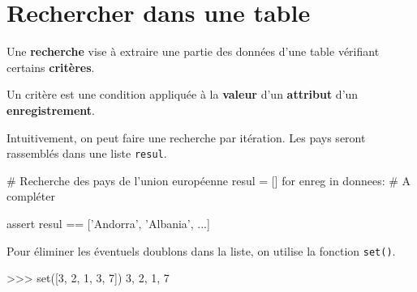 \pagebreak

\section{Rechercher dans une table}

\begin{definition}{}
Une \textbf{recherche} vise à extraire une partie des données d'une table vérifiant certains \textbf{critères}.

Un critère est une condition appliquée à la \textbf{valeur} d'un \textbf{attribut} d'un \textbf{enregistrement}.

\end{definition}


\begin{exercice_cours}{}

	Intuitivement, on peut faire une recherche par itération. Les pays seront rassemblés dans une liste \verb+resul+.

\begin{CodePythontexAlt}[TaillePolice=\normalsize, Largeur=1\linewidth,Centre,PremLigne=1, Lignes=false,]{}
# Recherche des pays de l'union européenne
resul = []
for enreg in donnees:
	# A compléter
	
	



assert resul == ['Andorra', 'Albania', ...]
\end{CodePythontexAlt}

\end{exercice_cours}

\begin{exercice_cours}{}


	\end{exercice_cours}


	\begin{remarque}{}
		Pour éliminer les éventuels doublons dans la liste, on utilise la fonction \verb+set()+.
	
	
\begin{CodePythontexAlt}[TaillePolice=\normalsize, Largeur=1\linewidth,Centre,PremLigne=1, Lignes=false,]{}
>>> set([3, 2, 1, 3, 7])
{3, 2, 1, 7}
\end{CodePythontexAlt}
	\end{remarque}


\begin{exercice_cours}{}


	\end{exercice_cours}

